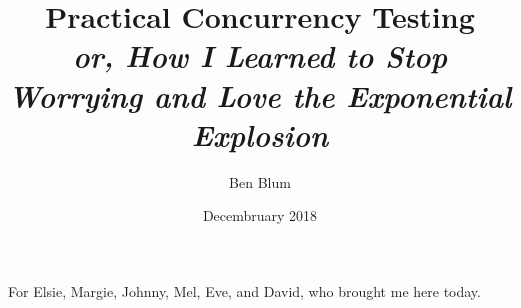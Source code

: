 \documentclass[12pt]{cmuthesis}
\begin{document}
 
\frontmatter

\pagestyle{empty}

\title{ %
{\bf Practical Concurrency Testing} \\
\normalsize \vspace{1em}
{\em or, How I Learned to Stop Worrying and Love the Exponential Explosion}}
\author{Ben Blum}
\date{Decembruary 2018}
\trnumber{}


\support{}
\disclaimer{}



\maketitle

\begin{dedication}
For Elsie, Margie, Johnny, Mel, Eve, and David, who brought me here today.
\end{dedication}

\pagestyle{plain} %

\end{document}
